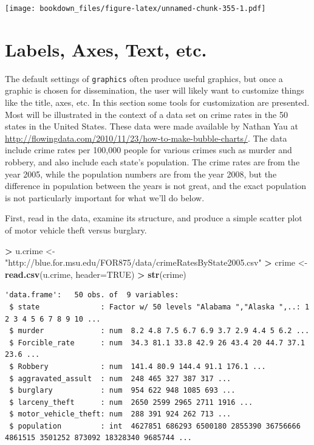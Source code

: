 \documentclass[]{krantz}
\makeatletter
\newenvironment{Shaded}{\begin{snugshade}}{\end{snugshade}}
\newcommand{\KeywordTok}[1]{\textcolor[rgb]{0.27,0.27,0.27}{\textbf{#1}}}
\newcommand{\DataTypeTok}[1]{\textcolor[rgb]{0.27,0.27,0.27}{#1}}
\newcommand{\StringTok}[1]{\textcolor[rgb]{0.5,0.5,0.5}{#1}}
\newcommand{\OtherTok}[1]{\textcolor[rgb]{0.37,0.37,0.37}{#1}}
\newcommand{\OperatorTok}[1]{\textcolor[rgb]{0.43,0.43,0.43}{\textbf{#1}}}
\newcommand{\NormalTok}[1]{#1}
\newenvironment{kframe}{%
\medskip{}
\setlength{\fboxsep}{.8em}
 \def\at@end@of@kframe{}%
 \ifinner\ifhmode%
  \def\at@end@of@kframe{\end{minipage}}%
  \begin{minipage}{\columnwidth}%
 \fi\fi%
 \def\FrameCommand##1{\hskip\@totalleftmargin \hskip-\fboxsep
 \colorbox{shadecolor}{##1}\hskip-\fboxsep
     \hskip-\linewidth \hskip-\@totalleftmargin \hskip\columnwidth}%
 \MakeFramed {\advance\hsize-\width
   \@totalleftmargin\z@ \linewidth\hsize
   \@setminipage}}%
 {\par\unskip\endMakeFramed%
 \at@end@of@kframe}
\renewenvironment{Shaded}{\begin{kframe}}{\end{kframe}}
\makeatother
\begin{document}
\texttt{[image: bookdown\_files/figure-latex/unnamed-chunk-355-1.pdf]}

\section{Labels, Axes, Text, etc.}\label{labels-axes-text-etc.-1}

The default settings of \texttt{graphics} often produce useful graphics,
but once a graphic is chosen for dissemination, the user will likely
want to customize things like the title, axes, etc. In this section some
tools for customization are presented. Most will be illustrated in the
context of a data set on crime rates in the 50 states in the United
States. These data were made available by Nathan Yau at
\url{http://flowingdata.com/2010/11/23/how-to-make-bubble-charts/}. The
data include crime rates per 100,000 people for various crimes such as
murder and robbery, and also include each state's population. The crime
rates are from the year 2005, while the population numbers are from the
year 2008, but the difference in population between the years is not
great, and the exact population is not particularly important for what
we'll do below.

First, read in the data, examine its structure, and produce a simple
scatter plot of motor vehicle theft versus burglary.

\begin{Shaded}
\begin{Highlighting}[]
\OperatorTok{>}\StringTok{ }\NormalTok{u.crime <-}\StringTok{ "http://blue.for.msu.edu/FOR875/data/crimeRatesByState2005.csv"}
\OperatorTok{>}\StringTok{ }\NormalTok{crime <-}\StringTok{ }\KeywordTok{read.csv}\NormalTok{(u.crime, }\DataTypeTok{header=}\OtherTok{TRUE}\NormalTok{)}
\OperatorTok{>}\StringTok{ }\KeywordTok{str}\NormalTok{(crime)}
\end{Highlighting}
\end{Shaded}

\begin{verbatim}
'data.frame':   50 obs. of  9 variables:
 $ state              : Factor w/ 50 levels "Alabama ","Alaska ",..: 1 2 3 4 5 6 7 8 9 10 ...
 $ murder             : num  8.2 4.8 7.5 6.7 6.9 3.7 2.9 4.4 5 6.2 ...
 $ Forcible_rate      : num  34.3 81.1 33.8 42.9 26 43.4 20 44.7 37.1 23.6 ...
 $ Robbery            : num  141.4 80.9 144.4 91.1 176.1 ...
 $ aggravated_assult  : num  248 465 327 387 317 ...
 $ burglary           : num  954 622 948 1085 693 ...
 $ larceny_theft      : num  2650 2599 2965 2711 1916 ...
 $ motor_vehicle_theft: num  288 391 924 262 713 ...
 $ population         : int  4627851 686293 6500180 2855390 36756666 4861515 3501252 873092 18328340 9685744 ...
\end{verbatim}
\end{document}

